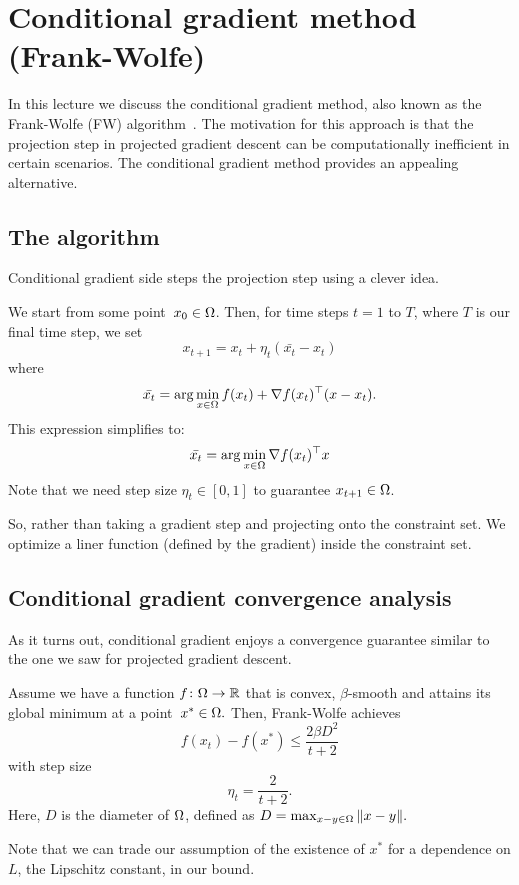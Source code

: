 \section{Conditional gradient method (Frank-Wolfe)}

In this lecture we discuss the conditional gradient method, also known as the
Frank-Wolfe (FW) algorithm~\cite{Frank1956}. The motivation for this approach is
that the projection step in projected gradient descent can be computationally
inefficient in certain scenarios. The conditional gradient method provides an
appealing alternative.

\subsection{The algorithm}
Conditional gradient side steps the projection step using a clever idea.

We start from some point~$x_0\in\Omega$. Then, for time steps $t = 1$ to $T$, 
where $T$ is our final time step, we set
\[
x_{t+1} = x_t + \eta_t(\bar{x_t}-x_t)
\]
where
$$ \bar{x_t} = \arg\min_{x\in \Omega} f(x_t) + \nabla f(x_t) ^\top (x-x_t).$$
This expression simplifies to:
$$ \bar{x_t} = \arg\min_{x\in \Omega} \nabla f(x_t) ^\top x $$
Note that we need step size $\eta_t \in [0,1]$ to guarantee $x_{t+1} \in \Omega$.

So, rather than taking a gradient step and projecting onto the constraint set.
We optimize a liner function (defined by the gradient) inside the constraint
set.

\subsection{Conditional gradient convergence analysis}

As it turns out, conditional gradient enjoys a convergence guarantee similar to
the one we saw for projected gradient descent.

\begin{theorem}
Assume we have a function $f\colon\Omega\to\mathbb{R}$ that is convex, $\beta$-smooth
and attains its global minimum at a point~$x^*\in\Omega.$ Then, Frank-Wolfe achieves
$$ f(x_t) - f(x^*) \leq \frac{2\beta D^2}{t+2}$$
with step size $$\eta_t = \frac{2}{t+2}.$$
Here, $D$ is the diameter of $\Omega$, defined as
$ D = \max_{x-y \in \Omega} \| x-y \|.$ 
\end{theorem}
Note that we can trade our assumption of the existence of $x^*$ for a dependence on $L$, the Lipschitz constant, in our bound.

